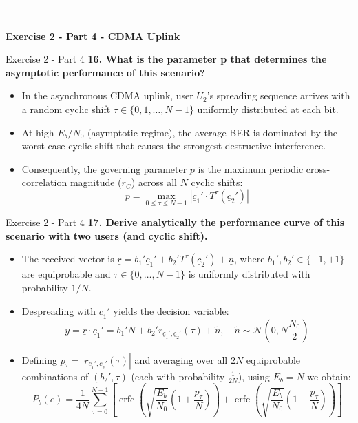 \documentclass[10pt, aspectratio=169]{beamer}
\newcommand{\question}[1]{{\color{QuestionRed}\textbf{#1}}}
\begin{document}
	\begin{frame}[plain]
		\vfill
		\centering
		{\color{TealAccent}\rule{2cm}{2pt}}\\[0.4cm]
		{\LARGE\bfseries\color{NavyPrimary} Exercise 2 - Part 4 - CDMA Uplink}\\[0.2cm]
		\vfill
	\end{frame}
	
	\begin{frame}{Exercise 2 - Part 4}
		\question{16. What is the parameter p that determines the asymptotic performance of this scenario?}
		
		\vspace{0.1cm}
		\begin{itemize}
			\item In the asynchronous CDMA uplink, user $U_2$'s spreading sequence arrives with a random cyclic shift $\tau \in \{0, 1, \dots, N-1\}$ uniformly distributed at each bit.
			\item At high $E_b/N_0$ (asymptotic regime), the average BER is dominated by the worst-case cyclic shift that causes the strongest destructive interference.
			\item Consequently, the governing parameter $p$ is the maximum periodic cross-correlation magnitude ($r_C$) across all $N$ cyclic shifts:
			\[
			p = \max_{0 \le \tau \le N-1} \left|\underline{c}_1' \cdot T^\tau(\underline{c}_2')\right|
			\]
		\end{itemize}
		
	\end{frame}
	
	\begin{frame}{Exercise 2 - Part 4}
		\question{17. Derive analytically the performance curve of this scenario with two users (and cyclic shift).}
		
		\vspace{0.1cm}
		\begin{itemize}
			\item The received vector is $\underline{r} = b_1'\underline{c}_1' + b_2'T^\tau(\underline{c}_2') + \underline{n}$, where $b_1', b_2' \in \{-1, +1\}$ are equiprobable and $\tau \in \{0, \dots, N-1\}$ is uniformly distributed with probability $1/N$.
			\item Despreading with $\underline{c}_1'$ yields the decision variable:
			\[
			y = \underline{r} \cdot \underline{c}_1' = b_1' N + b_2' r_{\underline{c}_1',\underline{c}_2'}(\tau) + \tilde{n}, \quad \tilde{n} \sim \mathcal{N}\!\left(0, N \frac{N_0}{2}\right)
			\]
			\item Defining $p_\tau = \left|r_{\underline{c}_1',\underline{c}_2'}(\tau)\right|$ and averaging over all $2N$ equiprobable combinations of $(b_2', \tau)$ (each with probability $\frac{1}{2N}$), using $E_b = N$ we obtain:
			\[
			P_b(e) = \frac{1}{4N} \sum_{\tau=0}^{N-1} \left[ \operatorname{erfc}\!\left(\sqrt{\frac{E_b}{N_0}}\left(1 + \frac{p_\tau}{N}\right)\right) + \operatorname{erfc}\!\left(\sqrt{\frac{E_b}{N_0}}\left(1 - \frac{p_\tau}{N}\right)\right) \right]
			\]
		\end{itemize}
		
	\end{frame}
	
\end{document}
